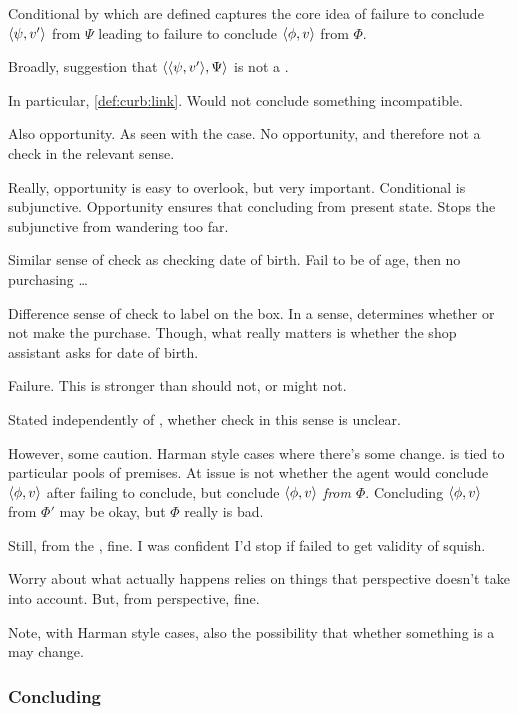 \begin{note}[Check]
  Conditional by which  are defined captures the core idea of failure to conclude \(\langle \psi, v' \rangle\) from \(\Psi\) leading to failure to conclude \(\langle \phi, v \rangle\) from \(\Phi\).

  Broadly, suggestion that \(\langle \langle \psi, v' \rangle, \Psi \rangle\) is not a \fc{}.

  In particular, \ref{def:curb:link}.
  Would not conclude something incompatible.

  Also opportunity.
  As seen with the \citeauthor{Dretske:1970to} case.
  No opportunity, and therefore not a check in the relevant sense.

  Really, opportunity is easy to overlook, but very important.
  Conditional is subjunctive.
  Opportunity ensures that concluding from present state.
  Stops the subjunctive from wandering too far.

  Similar sense of check as checking date of birth.
  Fail to be of age, then no purchasing \dots

  Difference sense of check to label on the box.
  In a sense, determines whether or not make the purchase.
  Though, what really matters is whether the shop assistant asks for date of birth.

  Failure.
  This is stronger than should not, or might not.
\end{note}

\begin{note}
  Stated independently of \agpe{}, whether check in this sense is unclear.

  However, some caution.
  Harman style cases where there's some change.
  \curb{} is tied to particular pools of premises.
  At issue is not whether the agent would conclude \(\langle \phi, v \rangle\) after failing to conclude, but conclude \(\langle \phi, v \rangle\) \emph{from \(\Phi\)}.
  Concluding \(\langle \phi, v \rangle\) from \(\Phi'\) may be okay, but \(\Phi\) really is bad.

  Still, from the \agpe{}, fine.
  I was confident I'd stop if failed to get validity of squish.

  Worry about what actually happens relies on things that perspective doesn't take into account.
  But, from perspective, fine.

  Note, with Harman style cases, also the possibility that whether something is a \curb{} may change.
\end{note}

\subsubsection{Concluding}

